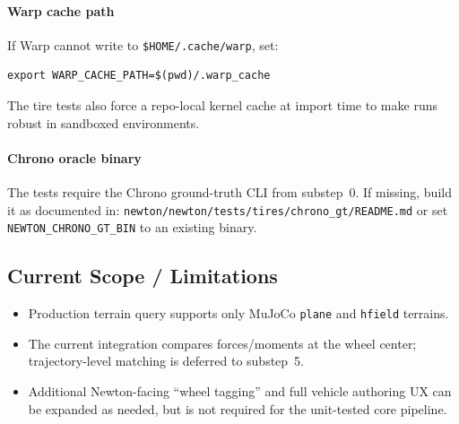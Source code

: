 \paragraph{Warp cache path}
If Warp cannot write to \texttt{\$HOME/.cache/warp}, set:
\begin{verbatim}
export WARP_CACHE_PATH=$(pwd)/.warp_cache
\end{verbatim}
The tire tests also force a repo-local kernel cache at import time to make runs robust in sandboxed environments.

\paragraph{Chrono oracle binary}
The tests require the Chrono ground-truth CLI from substep~0.
If missing, build it as documented in:
\texttt{newton/newton/tests/tires/chrono\_gt/README.md}
or set \texttt{NEWTON\_CHRONO\_GT\_BIN} to an existing binary.

\subsection{Current Scope / Limitations}
\begin{itemize}
  \item Production terrain query supports only MuJoCo \texttt{plane} and \texttt{hfield} terrains.
  \item The current integration compares forces/moments at the wheel center; trajectory-level matching is deferred to substep~5.
  \item Additional Newton-facing ``wheel tagging'' and full vehicle authoring UX can be expanded as needed, but is not required for the unit-tested core pipeline.
\end{itemize}

